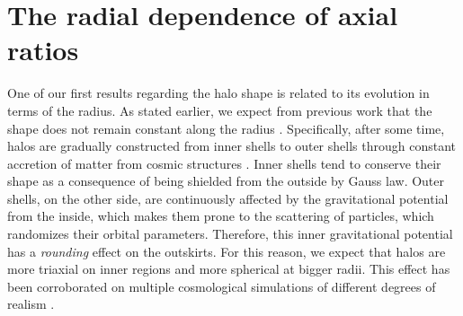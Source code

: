 \section{The radial dependence of axial ratios}
One of our first results regarding the halo shape is related to its evolution in terms of the radius. As stated earlier, we expect from previous work that the shape does not remain constant along the radius \cite{Vera-Ciro_et_al._2011}. Specifically, after some time, halos are gradually constructed from inner shells to outer shells through constant accretion of matter from cosmic structures \cite{Tormen_et_al._1997,Tormen_et_al._1998}. Inner shells tend to conserve their shape as a consequence of being shielded from the outside by Gauss law. Outer shells, on the other side, are continuously affected by the gravitational potential from the inside, which makes them prone to the scattering of particles, which randomizes their orbital parameters. Therefore, this inner gravitational potential has a \textit{rounding} effect on the outskirts. For this reason, we expect that halos are more triaxial on inner regions and more spherical at bigger radii. This effect has been corroborated on multiple cosmological simulations of different degrees of realism \cite{Frenk_et_al._1988,Dubinski_and_Carlberg_1991,Warren_et_al._1992,Cole_and_Lacey_1996,Hayashi_et_al._2007,Bett_et_al._2007,Vera-Ciro_et_al._2011}. \\


